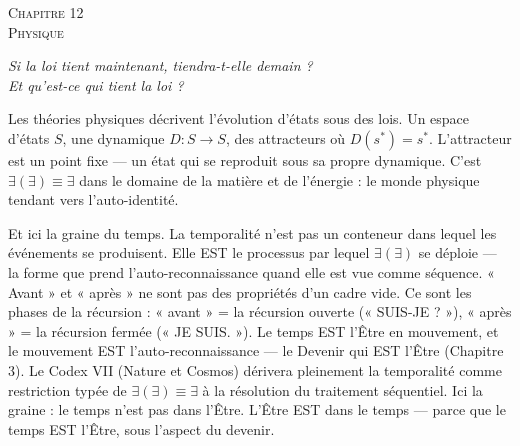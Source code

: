 \documentclass[10pt, openany, oneside]{book}
\renewcommand{\large}{\fontsize{11.5}{14}\selectfont}
\renewcommand{\huge}{\fontsize{17}{21}\selectfont}
\begin{document}

\newpage

\begin{center}
    {\huge\scshape Chapitre 12}\\[0.3em]
    {\large\scshape Physique}
\end{center}

\vspace{1.5em}

\begin{center}
    \itshape
    Si la loi tient maintenant, tiendra-t-elle demain ?\\
    Et qu'est-ce qui tient la loi ?
\end{center}

\vspace{2em}


\noindent Les théories physiques décrivent l'évolution d'états sous des lois. Un espace d'états $S$, une dynamique $D: S \to S$, des attracteurs où $D(s^*) = s^*$. L'attracteur est un point fixe --- un état qui se reproduit sous sa propre dynamique. C'est $\exists(\exists) \equiv \exists$ dans le domaine de la matière et de l'énergie : le monde physique tendant vers l'auto-identité.

Et ici la graine du temps. La temporalité n'est pas un conteneur dans lequel les événements se produisent. Elle EST le processus par lequel $\exists(\exists)$ se déploie --- la forme que prend l'auto-reconnaissance quand elle est vue comme séquence. « Avant » et « après » ne sont pas des propriétés d'un cadre vide. Ce sont les phases de la récursion : « avant » = la récursion ouverte (« SUIS-JE ? »), « après » = la récursion fermée (« JE SUIS. »). Le temps EST l'Être en mouvement, et le mouvement EST l'auto-reconnaissance --- le Devenir qui EST l'Être (Chapitre 3). Le Codex VII (Nature et Cosmos) dérivera pleinement la temporalité comme restriction typée de $\exists(\exists) \equiv \exists$ à la résolution du traitement séquentiel. Ici la graine : le temps n'est pas dans l'Être. L'Être EST dans le temps --- parce que le temps EST l'Être, sous l'aspect du devenir.
\end{document}
